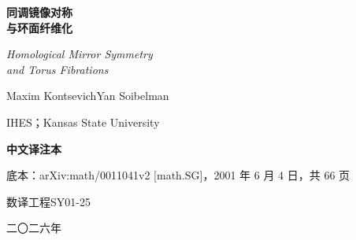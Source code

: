\begin{titlepage}
\centering
\vspace*{3.2cm}

{\Huge\bfseries 同调镜像对称\\[0.35em]与环面纤维化\par}

\vspace{1.2cm}

{\large\itshape Homological Mirror Symmetry\\[0.25em] and Torus Fibrations\par}

\vspace{1.6cm}

{\Large Maxim Kontsevich\quad Yan Soibelman\par}

\vspace{0.7cm}

{\normalsize IHES；Kansas State University\par}

\vspace{2.6cm}

{\Large\bfseries 中文译注本\par}

\vspace{0.6cm}

{\normalsize 底本：arXiv:math/0011041v2 [math.SG]，2001 年 6 月 4 日，共 66 页\par}

\vfill

{\small 数译工程\quad SY01-25\par}
{\small 二〇二六年\par}

\end{titlepage}

